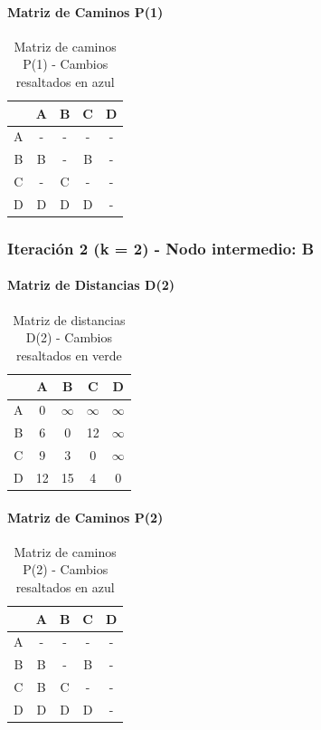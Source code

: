 \documentclass[12pt]{article}
\begin{document}
\paragraph{Matriz de Caminos P(1)}
\begin{table}[h!]
\centering
\begin{tabular}{|c|c|c|c|c|}
\hline
 & A & B & C & D \\\hline
A & - & - & - & - \\\hline
B & B & - & B & - \\\hline
C & - & C & - & - \\\hline
D & D & D & D & - \\\hline
\end{tabular}
\caption{Matriz de caminos P(1) - Cambios resaltados en azul}
\end{table}

\subsubsection{Iteración 2 (k = 2) - Nodo intermedio: B}
\paragraph{Matriz de Distancias D(2)}
\begin{table}[h!]
\centering
\begin{tabular}{|c|c|c|c|c|}
\hline
 & A & B & C & D \\\hline
A & 0 & $\infty$ & $\infty$ & $\infty$ \\\hline
B & 6 & 0 & 12 & $\infty$ \\\hline
C & \cellcolor{lightgreen} 9 & 3 & 0 & $\infty$ \\\hline
D & 12 & 15 & 4 & 0 \\\hline
\end{tabular}
\caption{Matriz de distancias D(2) - Cambios resaltados en verde}
\end{table}

\paragraph{Matriz de Caminos P(2)}
\begin{table}[h!]
\centering
\begin{tabular}{|c|c|c|c|c|}
\hline
 & A & B & C & D \\\hline
A & - & - & - & - \\\hline
B & B & - & B & - \\\hline
C & \cellcolor{lightblue} B & C & - & - \\\hline
D & D & D & D & - \\\hline
\end{tabular}
\caption{Matriz de caminos P(2) - Cambios resaltados en azul}
\end{table}
\end{document}
